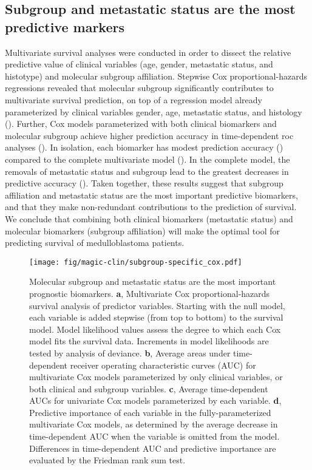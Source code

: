 \subsection{Subgroup and metastatic status are the most predictive markers}

Multivariate survival analyses were conducted in order to dissect the relative predictive value of clinical variables (age, gender, metastatic status, and histotype) and molecular subgroup affiliation. Stepwise Cox proportional-hazards regressions revealed that molecular subgroup significantly contributes to multivariate survival prediction, on top of a regression model already parameterized by clinical variables gender, age, metastatic status, and histology (). Further, Cox models parameterized with both clinical biomarkers and molecular subgroup achieve higher prediction accuracy in time-dependent \gls{roc} analyses (). In isolation, each biomarker has modest prediction accuracy () compared to the complete multivariate model (). In the complete model, the removals of metastatic status and subgroup lead to the greatest decreases in predictive accuracy (). Taken together, these results suggest that subgroup affiliation and metastatic status are the most important predictive biomarkers, and that they make non-redundant contributions to the prediction of survival. We conclude that combining both clinical biomarkers (metastatic status) and molecular biomarkers (subgroup affiliation) will make the optimal tool for predicting survival of medulloblastoma patients.

\begin{figure}[h]
	\begin{center}
		\texttt{[image: fig/magic-clin/subgroup-specific\_cox.pdf]}
	\end{center}
	\caption[Molecular subgroup and metastatic status are the most important prognostic biomarkers]
	{
	Molecular subgroup and metastatic status are the most important prognostic biomarkers.
	\textbf{a}, Multivariate Cox proportional-hazards survival analysis of predictor variables. Starting with the null model, each variable is added stepwise (from top to bottom) to the survival model. Model likelihood values assess the degree to which each Cox model fits the survival data. Increments in model likelihoods are tested by analysis of deviance. 
	\textbf{b}, Average areas under time-dependent receiver operating characteristic curves (AUC) for multivariate Cox models parameterized by only clinical variables, or both clinical and subgroup variables.
	\textbf{c}, Average time-dependent AUCs for univariate Cox models parameterized by each variable.
	\textbf{d}, Predictive importance of each variable in the fully-parameterized multivariate Cox models, as determined by the average decrease in time-dependent AUC when the variable is omitted from the model.
	Differences in time-dependent AUC and predictive importance are evaluated by the Friedman rank sum test.
	}
	\label{fig:subgroup-specific_cox}
\end{figure}

